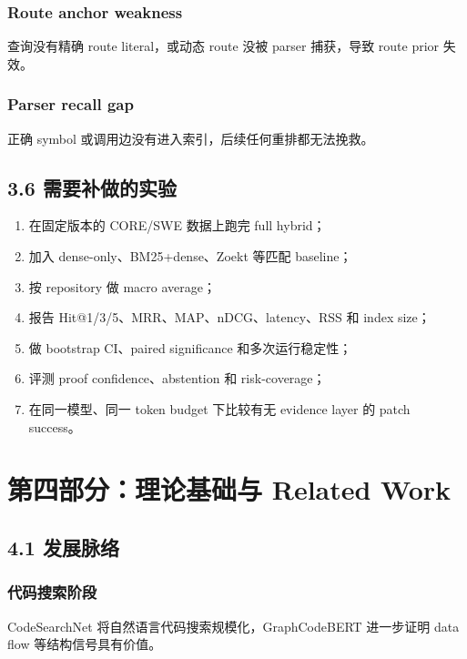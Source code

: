 \documentclass[UTF8,12pt,openany]{ctexbook}
\begin{document}
\subsection{Route anchor weakness}

查询没有精确 route literal，或动态 route 没被 parser 捕获，导致 route prior 失效。\par

\subsection{Parser recall gap}

正确 symbol 或调用边没有进入索引，后续任何重排都无法挽救。\par

\section{3.6 需要补做的实验}

\begin{enumerate}
\item 在固定版本的 CORE/SWE 数据上跑完 full hybrid；
\item 加入 dense-only、BM25+dense、Zoekt 等匹配 baseline；
\item 按 repository 做 macro average；
\item 报告 Hit@1/3/5、MRR、MAP、nDCG、latency、RSS 和 index size；
\item 做 bootstrap CI、paired significance 和多次运行稳定性；
\item 评测 proof confidence、abstention 和 risk-coverage；
\item 在同一模型、同一 token budget 下比较有无 evidence layer 的 patch success。
\end{enumerate}

\clearpage
\chapter{第四部分：理论基础与 Related Work}

\section{4.1 发展脉络}

\subsection{代码搜索阶段}

CodeSearchNet 将自然语言代码搜索规模化，GraphCodeBERT 进一步证明 data flow 等结构信号具有价值。\par
\end{document}
